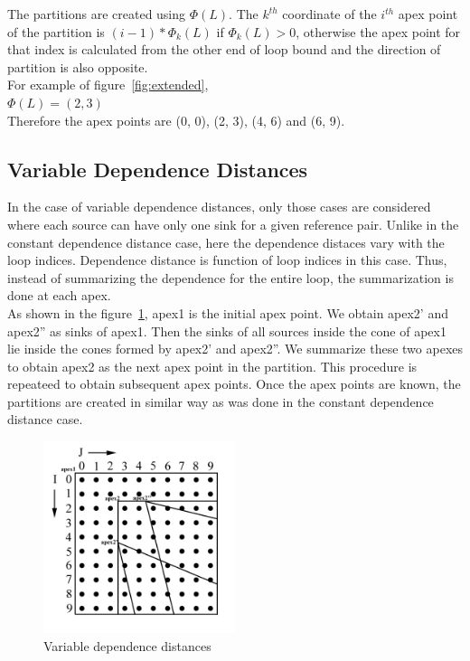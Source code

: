 The partitions are created using $\Phi(L)$. The $k^{th}$ coordinate of the $i^{th}$ apex point of the partition is $(i-1)*\Phi_k(L)$ if $\Phi_k(L) > 0$, otherwise the apex point for that index is calculated from the other end of loop bound and the direction of partition is also opposite. \\

For example of figure~\ref{fig:extended}, \\
$\Phi(L) = (2, 3)$ \\
Therefore the apex points are (0, 0), (2, 3), (4, 6) and (6, 9). \\

\subsection{Variable Dependence Distances}

In the case of variable dependence distances, only those cases are considered where each source can have only one sink for a given reference pair. Unlike in the constant dependence distance case, here the dependence distaces vary with the loop indices. Dependence distance is function of loop indices in this case. Thus, instead of summarizing the dependence for the entire loop, the summarization is done at each apex. \\

As shown in the figure~\ref{fig:variable1}, apex1 is the initial apex point. We obtain apex2' and apex2'' as sinks of apex1. Then the sinks of all sources inside the cone of apex1 lie inside the cones formed by apex2' and apex2''. We summarize these two apexes to obtain apex2 as the next apex point in the partition. This procedure is repeateed to obtain subsequent apex points. Once the apex points are known, the partitions are created in similar way as was done in the constant dependence distance case. \\

\begin{figure}
\caption{Variable dependence distances}
\label{fig:variable1}
\centering \includegraphics[width=0.5\textwidth]{Figures/variable1.jpg}
\end{figure}


